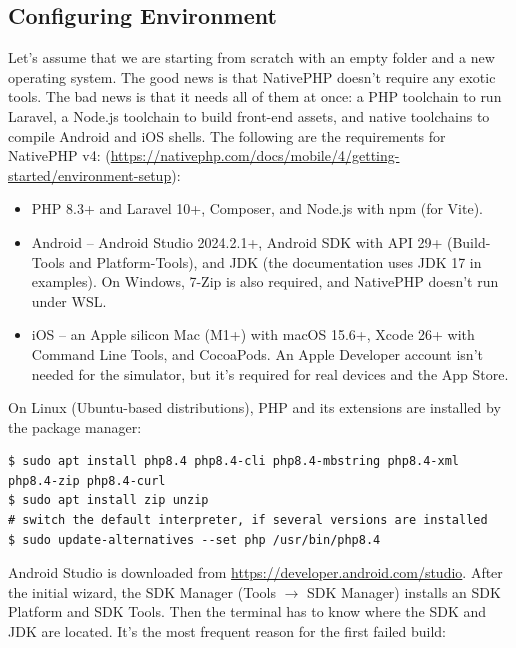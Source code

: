 
\subsection{Configuring Environment} \label{first-step}

Let's assume that we are starting from scratch with an empty folder and a new operating system.
The good news is that NativePHP doesn't require any exotic tools. The bad news is that it needs
all of them at once: a PHP toolchain to run Laravel, a Node.js toolchain to build front-end
assets, and native toolchains to compile Android and iOS shells. The following are the
requirements for NativePHP v4: (\href{https://nativephp.com/docs/mobile/4/getting-started/environment-setup}{https://nativephp.com/docs/mobile/4/getting-started/environment-setup}):

\begin{itemize}
  \item PHP 8.3+ and Laravel 10+, Composer, and Node.js with npm (for Vite).

  \item Android -- Android Studio 2024.2.1+, Android SDK with API 29+ (Build-Tools and
  Platform-Tools), and JDK (the documentation uses JDK 17 in examples). On Windows, 7-Zip is also
  required, and NativePHP doesn't run under WSL.

  \item iOS -- an Apple silicon Mac (M1+) with macOS 15.6+, Xcode 26+ with Command Line Tools,
  and CocoaPods. An Apple Developer account isn't needed for the simulator, but it's required
  for real devices and the App Store.
\end{itemize}

\noindent On Linux (Ubuntu-based distributions), PHP and its extensions are installed by the
package manager:

\begin{lstlisting}[language=terminal]
$ sudo apt install php8.4 php8.4-cli php8.4-mbstring php8.4-xml php8.4-zip php8.4-curl
$ sudo apt install zip unzip
# switch the default interpreter, if several versions are installed
$ sudo update-alternatives --set php /usr/bin/php8.4
\end{lstlisting}

\noindent Android Studio is downloaded from
\href{https://developer.android.com/studio}{https://developer.android.com/studio}. After the
initial wizard, the SDK Manager (Tools $\rightarrow$ SDK Manager) installs an SDK Platform and
SDK Tools. Then the terminal has to know where the SDK and JDK are located. It's the most
frequent reason for the first failed build:

